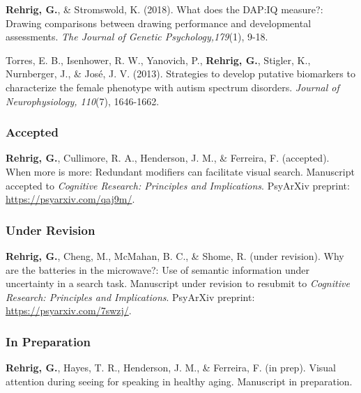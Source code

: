 \textbf{Rehrig, G.}, \& Stromswold, K. (2018). What does the DAP:IQ measure?: Drawing comparisons between drawing performance and developmental assessments. \textit{The Journal of Genetic Psychology,179}(1), 9-18.


Torres, E. B., Isenhower, R. W., Yanovich, P., \textbf{Rehrig, G.}, Stigler, K., Nurnberger, J., \& Jos\'e, J. V. (2013). Strategies to develop putative biomarkers to characterize the female phenotype with autism spectrum disorders. \textit{Journal of Neurophysiology, 110}(7), 1646-1662.

\subsubsection*{Accepted}

\textbf{Rehrig, G.}, Cullimore, R. A., Henderson, J. M., \& Ferreira, F. (accepted). When more is more: Redundant modifiers can facilitate visual search. Manuscript accepted to \textit{Cognitive Research: Principles and Implications}. PsyArXiv preprint: \url{https://psyarxiv.com/qaj9m/}.

\subsubsection*{Under Revision}

\textbf{Rehrig, G.}, Cheng, M., McMahan, B. C., \& Shome, R. (under revision). Why are the batteries in the microwave?: Use of semantic information under uncertainty in a search task. Manuscript under revision to resubmit to \textit{Cognitive Research: Principles and Implications}. PsyArXiv preprint: \url{https://psyarxiv.com/7swzj/}.





\subsubsection*{In Preparation}

\textbf{Rehrig, G.}, Hayes, T. R., Henderson, J. M., \& Ferreira, F. (in prep). Visual attention during seeing for speaking in healthy aging. Manuscript in preparation. %

